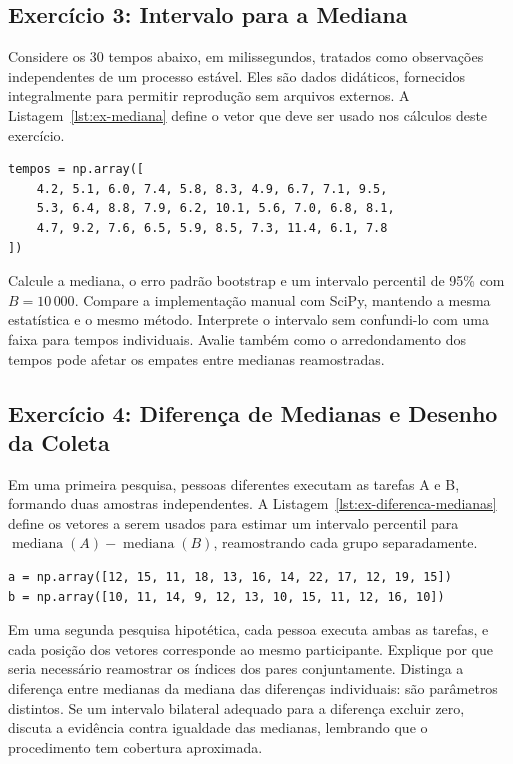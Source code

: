 \documentclass[12pt,a4paper]{article}
\begin{document}
\subsection*{Exercício 3: Intervalo para a Mediana}
Considere os 30 tempos abaixo, em milissegundos, tratados como observações independentes de um processo estável. Eles são dados didáticos, fornecidos integralmente para permitir reprodução sem arquivos externos. A Listagem~\ref{lst:ex-mediana} define o vetor que deve ser usado nos cálculos deste exercício.
\begin{lstlisting}[caption={Dados do Exercicio 3.},label={lst:ex-mediana}]
tempos = np.array([
    4.2, 5.1, 6.0, 7.4, 5.8, 8.3, 4.9, 6.7, 7.1, 9.5,
    5.3, 6.4, 8.8, 7.9, 6.2, 10.1, 5.6, 7.0, 6.8, 8.1,
    4.7, 9.2, 7.6, 6.5, 5.9, 8.5, 7.3, 11.4, 6.1, 7.8
])
\end{lstlisting}
Calcule a mediana, o erro padrão bootstrap e um intervalo percentil de 95\% com $B=10\,000$. Compare a implementação manual com SciPy, mantendo a mesma estatística e o mesmo método. Interprete o intervalo sem confundi-lo com uma faixa para tempos individuais. Avalie também como o arredondamento dos tempos pode afetar os empates entre medianas reamostradas.

\subsection*{Exercício 4: Diferença de Medianas e Desenho da Coleta}
Em uma primeira pesquisa, pessoas diferentes executam as tarefas A e B, formando duas amostras independentes. A Listagem~\ref{lst:ex-diferenca-medianas} define os vetores a serem usados para estimar um intervalo percentil para $\operatorname{mediana}(A)-\operatorname{mediana}(B)$, reamostrando cada grupo separadamente.
\begin{lstlisting}[caption={Dados do Exercicio 4.},label={lst:ex-diferenca-medianas}]
a = np.array([12, 15, 11, 18, 13, 16, 14, 22, 17, 12, 19, 15])
b = np.array([10, 11, 14, 9, 12, 13, 10, 15, 11, 12, 16, 10])
\end{lstlisting}
Em uma segunda pesquisa hipotética, cada pessoa executa ambas as tarefas, e cada posição dos vetores corresponde ao mesmo participante. Explique por que seria necessário reamostrar os índices dos pares conjuntamente. Distinga a diferença entre medianas da mediana das diferenças individuais: são parâmetros distintos. Se um intervalo bilateral adequado para a diferença excluir zero, discuta a evidência contra igualdade das medianas, lembrando que o procedimento tem cobertura aproximada.
\end{document}
